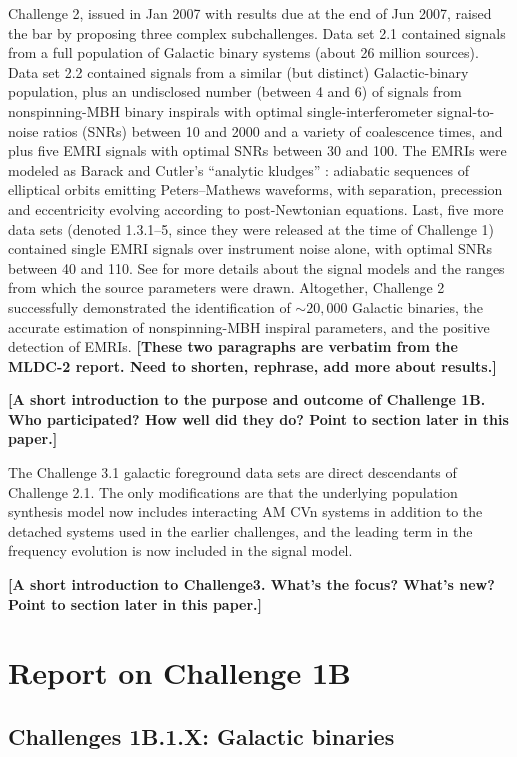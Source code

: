 \documentclass{iopart}
\begin{document}
Challenge 2, issued in Jan 2007 with results due at the end of Jun 2007, raised the bar by proposing three complex subchallenges. Data set 2.1 contained signals from a full population of Galactic binary systems (about 26 million sources). Data set 2.2 contained signals from a similar (but distinct) Galactic-binary population, plus an undisclosed number (between 4 and 6) of signals from nonspinning-MBH binary inspirals with optimal single-interferometer signal-to-noise ratios (SNRs) between 10 and 2000 and a variety of coalescence times, and plus five EMRI signals with optimal SNRs between 30 and 100. The EMRIs were modeled as Barack and Cutler's ``analytic kludges'' \cite{barackcutler}: adiabatic sequences of elliptical orbits emitting Peters--Mathews waveforms, with separation, precession and eccentricity evolving according to post-Newtonian equations. Last, five more data sets (denoted 1.3.1--5, since they were released at the time of Challenge 1) contained single EMRI signals over instrument noise alone, with optimal SNRs between 40 and 110. See \cite{mldcgwdaw2} for more details about the signal models and the ranges from which the source parameters were drawn.
Altogether, Challenge 2 successfully demonstrated the identification of $\sim 20,000$ Galactic binaries, the accurate estimation of nonspinning-MBH inspiral parameters, and the positive detection of EMRIs.
\textbf{[These two paragraphs are verbatim from the MLDC-2 report. Need to shorten, rephrase, add more about results.]}

\textbf{[A short introduction to the purpose and outcome of Challenge 1B. Who participated? How well did they do? Point to section later in this paper.]}


The Challenge 3.1 galactic foreground data sets are direct descendants of Challenge 2.1.
The only modifications are that the underlying population synthesis model now includes interacting
AM CVn systems in addition to the detached systems used in the earlier
challenges, and the leading term in the frequency evolution is now
included in the signal model.

\textbf{[A short introduction to Challenge3. What's the focus? What's new? Point to section later in this paper.]}

\section{Report on Challenge 1B}

\subsection{Challenges 1B.1.X: Galactic binaries}
\end{document}
